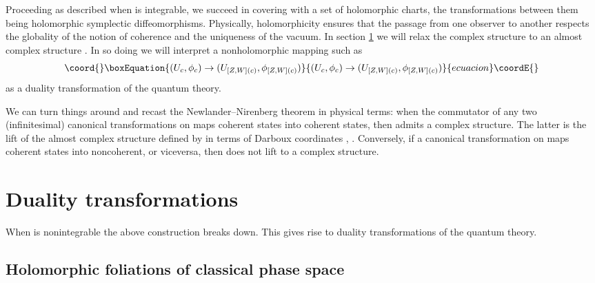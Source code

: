 \documentclass[a4paper,a4paper]{article}
\begin{document}
Proceeding as described when \coordHE{} is integrable, we succeed in covering 
\coordHE{} with a set of holomorphic charts, the transformations between 
them being holomorphic symplectic diffeomorphisms. Physically, 
holomorphicity ensures that the passage from one observer to another 
respects the globality of the notion of coherence and the 
uniqueness of the vacuum. In section \ref{dual} we will relax the complex 
structure \coordHE{} to an almost complex structure \coordHE{}. 
In so doing we will interpret a nonholomorphic mapping such as 
\begin{equation}\coord{}\boxEquation{
(U_c, \phi_c)\rightarrow (U_{[Z,W](c)}, \phi_{[Z,W](c)})
\label{nonc}
}{
(U_c, \phi_c)\rightarrow (U_{[Z,W](c)}, \phi_{[Z,W](c)})
}{ecuacion}\coordE{}\end{equation}
as a duality transformation of the quantum theory.

We can turn things around and recast the Newlander--Nirenberg 
theorem in physical terms: when the commutator of any two (infinitesimal) 
canonical transformations on \coordHE{} maps coherent states into coherent states, 
then \coordHE{} admits a complex structure. 
The latter is the lift of the almost complex structure \coordHE{} defined 
by \coordHE{} in terms of Darboux coordinates \coordHE{}, \coordHE{}. Conversely, 
if a canonical transformation on \coordHE{} maps coherent states into 
noncoherent, or viceversa, then \coordHE{} does not lift to a complex 
structure.
 
\section{Duality transformations}\label{dual}

When \coordHE{} is nonintegrable the above construction breaks down.
This gives rise to duality transformations of the quantum theory.

\subsection{Holomorphic foliations of classical phase space}\label{nonint}
\end{document}

